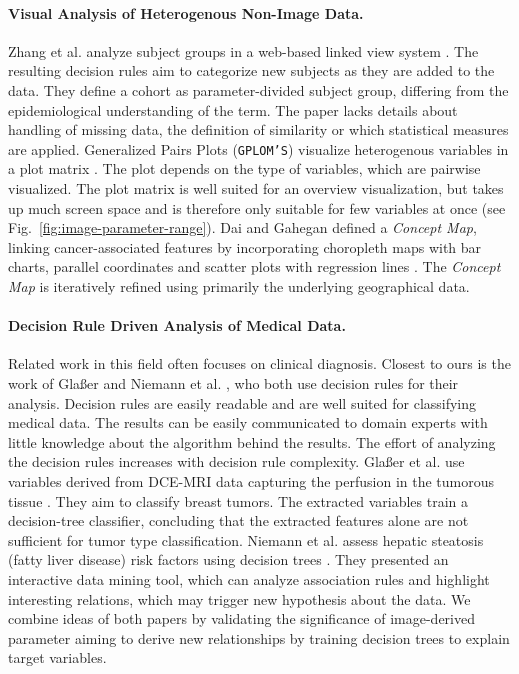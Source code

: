 \documentclass[a4paper,twoside]{style/article}
\begin{document}
\paragraph{Visual Analysis of Heterogenous Non-Image Data.}
Zhang et al. analyze subject groups in a web-based linked view system \cite{Zhang}.
The resulting decision rules aim to categorize new subjects as they are added to the data.
They define a cohort as parameter-divided subject group, differing from the epidemiological understanding of the term.
The paper lacks details about handling of missing data, the definition of similarity or which statistical measures are applied.
Generalized Pairs Plots (\texttt{GPLOM'S}) visualize heterogenous variables in a plot matrix \cite{GPLOMS,Francois}.
The plot depends on the type of variables, which are pairwise visualized.
The plot matrix is well suited for an overview visualization, but takes up much screen space and is therefore only suitable for few variables at once (see Fig.~\ref{fig:image-parameter-range}).
Dai and Gahegan defined a \emph{Concept Map}, linking cancer-associated features by incorporating choropleth maps with bar charts, parallel coordinates and scatter plots with regression lines \cite{Dai}.
The \emph{Concept Map} is iteratively refined using primarily the underlying geographical data.
\paragraph{Decision Rule Driven Analysis of Medical Data.}
Related work in this field often focuses on clinical diagnosis.
Closest to ours is the work of Gla{\ss}er \cite{Glasser2013} and Niemann et al. \cite{Niemann2014}, who both use decision rules for their analysis.
Decision rules are easily readable and are well suited for classifying medical data.
The results can be easily communicated to domain experts with little knowledge about the algorithm behind the results.
The effort of analyzing the decision rules increases with decision rule complexity.
Gla{\ss}er et al. use variables derived from DCE-MRI data capturing the perfusion in the tumorous tissue \cite{Glasser2013}.
They aim to classify breast tumors.
The extracted variables train a decision-tree classifier, concluding that the extracted features alone are not sufficient for tumor type classification.
Niemann et al. assess hepatic steatosis (fatty liver disease) risk factors using decision trees \cite{Niemann2014}.
They presented an interactive data mining tool, which can analyze association rules and highlight interesting relations, which may trigger new hypothesis about the data.
We combine ideas of both papers by validating the significance of image-derived parameter aiming to derive new relationships by training decision trees to explain target variables.
\end{document}
